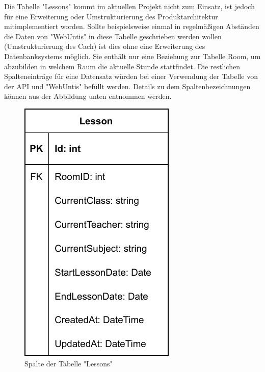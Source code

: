 Die Tabelle "Lessons" kommt im aktuellen Projekt nicht zum Einsatz, ist jedoch für eine Erweiterung oder Umstrukturierung des Produktarchitektur mitimplementiert worden. Sollte beispielsweise einmal in regelmäßigen Abständen die Daten von "WebUntis" in diese Tabelle geschrieben werden wollen (Umstrukturierung des Cach) ist dies ohne eine Erweiterung des Datenbanksystems möglich. Sie enthält nur eine Beziehung zur Tabelle Room, um abzubilden in welchem Raum die aktuelle Stunde stattfindet. Die restlichen Spalteneinträge für eine Datensatz würden bei einer Verwendung der Tabelle von der API und "WebUntis" befüllt werden. Details zu dem Spaltenbezeichnungen können aus der Abbildung unten entnommen werden.

\begin{figure}[H]
    \centering
    \includegraphics{media/MariaDB/Lesson.svg.pdf}
    \caption{Spalte der Tabelle "Lessons"}
\end{figure}
